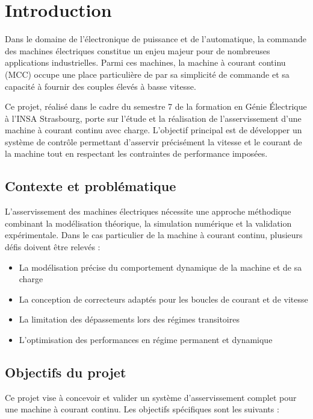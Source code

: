 \chapter*{Introduction}

Dans le domaine de l'électronique de puissance et de l'automatique, la commande des machines électriques constitue un enjeu majeur pour de nombreuses applications industrielles. Parmi ces machines, la machine à courant continu (MCC) occupe une place particulière de par sa simplicité de commande et sa capacité à fournir des couples élevés à basse vitesse.

Ce projet, réalisé dans le cadre du semestre 7 de la formation en Génie Électrique à l'INSA Strasbourg, porte sur l'étude et la réalisation de l'asservissement d'une machine à courant continu avec charge. L'objectif principal est de développer un système de contrôle permettant d'asservir précisément la vitesse et le courant de la machine tout en respectant les contraintes de performance imposées.

\section{Contexte et problématique}

L'asservissement des machines électriques nécessite une approche méthodique combinant la modélisation théorique, la simulation numérique et la validation expérimentale. Dans le cas particulier de la machine à courant continu, plusieurs défis doivent être relevés :

\begin{itemize}
    \item La modélisation précise du comportement dynamique de la machine et de sa charge
    \item La conception de correcteurs adaptés pour les boucles de courant et de vitesse
    \item La limitation des dépassements lors des régimes transitoires
    \item L'optimisation des performances en régime permanent et dynamique
\end{itemize}

\section{Objectifs du projet}

Ce projet vise à concevoir et valider un système d'asservissement complet pour une machine à courant continu. Les objectifs spécifiques sont les suivants :

